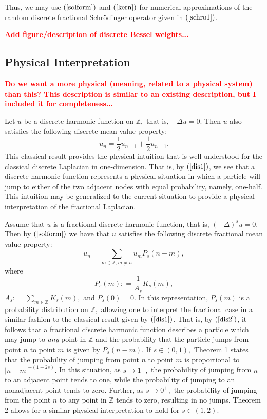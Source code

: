 \documentclass[final,1p,times]{elsarticle}
\def\ZZ{\mathbb Z} %
\newcommand{\bb}[1]{\begin{equation}\label{#1}}
\newcommand{\ee}{\end{equation}}
\newcommand{\no}{\noindent}
\def\R#1{$(\ref{#1})$}
\theoremstyle{remark}
\theoremstyle{definition}
\newcommand{\josh}[1]{\textcolor{red}{\textbf{#1}}}
\begin{document}

Thus, we may use \R{solform} and \R{kern} for numerical approximations of the random discrete fractional Schr{\"o}dinger operator given in \R{schro1}.

\vspace{3mm}

\no\josh{Add figure/description of discrete Bessel weights...}

\subsection{Physical Interpretation}

\no\josh{Do we want a more physical (meaning, related to a physical system) than this? This description is similar to an existing description, but I included it for completeness...}

Let $u$ be a discrete harmonic function on $\ZZ,$ that is, $-\Delta u = 0.$ Then $u$ also satisfies the following discrete mean value property:
\bb{dis1}
u_n = \frac{1}{2}u_{n-1}+\frac{1}{2}u_{n+1}.
\ee
This classical result provides the physical intuition that is well understood for the classical discrete Laplacian in one-dimension. That is, by \R{dis1}, we see that a discrete harmonic function represents a physical situation in which a particle will jump to either of the two adjacent nodes with equal probability, namely, one-half. This intuition may be generalized to the current situation to provide a physical interpretation of the fractional Laplacian. 

Assume that $u$ is a fractional discrete harmonic function, that is, $(-\Delta)^su = 0.$ Then by \R{solform} we have that $u$ satisfies the following discrete fractional mean value property:
\bb{dis2}
u_n = \sum_{m\in\ZZ,m\neq n}u_mP_s(n-m),
\ee
where
\bb{disp}
P_s(m)\mathrel{\mathop:}= \frac{1}{A_s}K_s(m),
\ee
$A_s \mathrel{\mathop:}= \textstyle\sum_{m\in\ZZ} K_s(m),$ and $P_s(0) = 0.$ In this representation, $P_s(m)$ is a probability distribution on $\ZZ,$ allowing one to interpret the fractional case in a similar fashion to the classical result given by \R{dis1}. That is, by \R{dis2}, it follows that a fractional discrete harmonic function describes a particle which may jump to {\em any} point in $\ZZ$ and the probability that the particle jumps from point $n$ to point $m$ is given by $P_s(n-m).$ If $s\in (0,1),$ Theorem 1 states that the probability of jumping from point $n$ to point $m$ is proportional to $|n-m|^{-(1+2s)}.$ In this situation, as $s\to 1^-,$ the probability of jumping from $n$ to an adjacent point tends to one, while the probability of jumping to an nonadjacent point tends to zero. Further, as $s\to 0^+,$ the probability of jumping from the point $n$ to any point in $\ZZ$ tends to zero, resulting in no jumps. Theorem 2 allows for a similar physical interpretation to hold for $s\in (1,2).$ 
\end{document}
